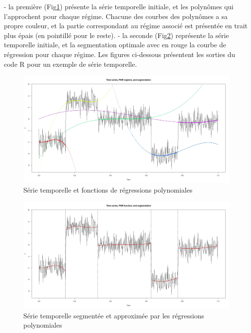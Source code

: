\documentclass[12pt]{article}
\begin{document}
- la première (Fig\ref{fig: segmentation1}) présente la série temporelle initiale, et les polynômes qui l'approchent pour chaque régime. Chacune des courbes des polynômes a sa propre couleur, et la partie correspondant au régime associé est présentée en trait plus épais (en pointillé pour le reste).
- la seconde  (Fig\ref{fig: segmentation2}) représente la série temporelle initiale, et la segmentation optimale avec en rouge la courbe de régression pour chaque régime.  
\smallbreak
\smallbreak
Les figures ci-dessous présentent les sorties du code R pour un exemple de série temporelle.
\smallbreak
\begin{figure}[H] 
\centering
\includegraphics[scale=.25]{segmentation1.jpeg}
\caption{\label{fig: segmentation1} Série temporelle et fonctions de régressions polynomiales}
\end{figure}

\begin{figure}[H] 
\centering
\includegraphics[scale=.25]{segmentation.jpeg}
\caption{\label{fig: segmentation2} Série temporelle segmentée et approximée par les régressions polynomiales}
\end{figure} 
\end{document}
